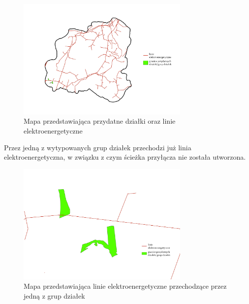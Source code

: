 \documentclass{article}
\begin{document}
\begin{figure}[H]
    \centering
    \includegraphics[width=0.75\textwidth]{img/plesna-dzialki-linie.jpg}
    \caption{Mapa przedstawiająca przydatne działki oraz linie elektroenergetyczne}
\end{figure}

Przez jedną z wytypowanych grup działek przechodzi już linia elektroenergetyczna, w związku z czym ścieżka przyłącza nie została utworzona.

\begin{figure}[H]
    \centering
    \includegraphics[width=0.75\textwidth]{img/plesna-braksciezki.jpg}
    \caption{Mapa przedstawiająca linie elektroenergetyczne przechodzące przez jedną z grup działek}
\end{figure}
\end{document}
